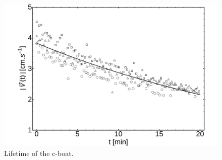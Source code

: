 \documentclass[aps, twocolumn, floatfix, superscriptaddress]{revtex4}
\begin{document}
\begin{figure}[h]
    \begin{center}
       \includegraphics[scale=0.25]{figure6.pdf}
    \end{center}
    \caption{Lifetime of the c-boat.}
    \label{fig:lifetime}
\end{figure}
\end{document}
